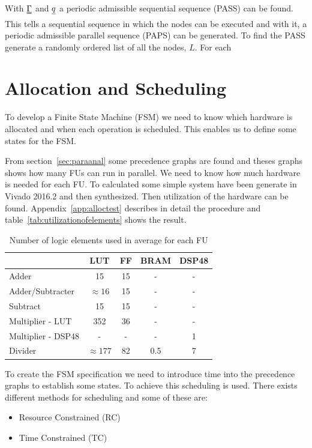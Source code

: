 With $\uuline \Gamma$ and $\uline q$ a periodic admissible sequential sequence (PASS) can be found. This tells a sequential sequence in which the nodes can be executed and with it, a periodic admissible parallel sequence (PAPS) can be generated. To find the PASS generate a randomly ordered list of all the nodes, $L$. For each 

\section{Allocation and Scheduling}\label{sec:allocsched}
To develop a Finite State Machine (FSM) we need to know which hardware is allocated and when each operation is scheduled. This enables us to define some states for the FSM.

From section~\vref{sec:paraanal} some precedence graphs are found and theses graphs shows how many FUs can run in parallel. We need to know how much hardware is needed for each FU. To calculated some simple system have been generate in Vivado 2016.2 and then synthesized. Then utilization of the hardware can be found. Appendix~\vref{app:alloctest} describes in detail the procedure and table~\ref{tab:utilizationofelements} shows the result.
\begin{table}[ht!]
\centering
\begin{tabular}{l | c c c c }
  \toprule
   &  LUT & FF & BRAM & DSP48 \\
  \midrule
  Adder & 15 & 15 & - & - \\
  Adder/Subtracter  & $\approx 16$ &  15 & - & - \\
  Subtract  & 15 &  15 & - & - \\
  Multiplier - LUT  & 352 &  36 & - & - \\
  Multiplier - DSP48 & - & - & - & 1 \\
  Divider & $\approx 177$ & 82 & 0.5 & 7 \\
  \bottomrule
\end{tabular}
\caption{Number of logic elements used in average for each FU}
\label{tab:apputilizationofelements}
\end{table}

To create the FSM specification we need to introduce time into the precedence graphs to establish some states. To achieve this scheduling is used. There exists different methods for scheduling and some of these are:
\begin{itemize}
  \item Resource Constrained (RC)
  \item Time Constrained (TC)
\end{itemize}

